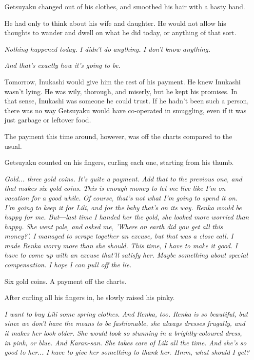 Getsuyaku changed out of his clothes, and smoothed his hair with a hasty
hand.

He had only to think about his wife and daughter. He would not allow his
thoughts to wander and dwell on what he did today, or anything of that
sort.

\emph{Nothing happened today. I didn't do anything. I don't know anything.}

\emph{And that's exactly how it's going to be.}

Tomorrow, Inukashi would give him the rest of his payment. He knew
Inukashi wasn't lying. He was wily, thorough, and miserly, but he kept
his promises. In that sense, Inukashi was someone he could trust. If he
hadn't been such a person, there was no way Getsuyaku would have
co-operated in smuggling, even if it was just garbage or leftover food.

The payment this time around, however, was off the charts compared to
the usual.

Getsuyaku counted on his fingers, curling each one, starting from his
thumb.

\emph{Gold... three gold coins. It's quite a payment. Add that to the previous
	one, and that makes six gold coins. This is enough money to let me live
	like I'm on vacation for a good while. Of course, that's not what I'm
	going to spend it on. I'm going to keep it for Lili, and for the baby
	that's on its way. Renka would be happy for me. But―last time I handed
	her the gold, she looked more worried than happy. She went pale, and
	asked me, 'Where on earth did you get all this money?'. I managed to
	scrape together an excuse, but that was a close call. I made Renka worry
	more than she should. This time, I have to make it good. I have to come
	up with an excuse that'll satisfy her. Maybe something about special
	compensation. I hope I can pull off the lie.}

Six gold coins. A payment off the charts.

After curling all his fingers in, he slowly raised his pinky.

\emph{I want to buy Lili some spring clothes. And Renka, too. Renka is so
	beautiful, but since we don't have the means to be fashionable, she
	always dresses frugally, and it makes her look older. She would look so
	stunning in a brightly-coloured dress, in pink, or blue. And Karan-san.
	She takes care of Lili all the time. And she's so good to her... I have
	to give her something to thank her. Hmm, what should I get?}

